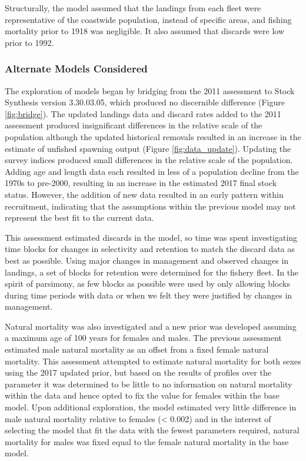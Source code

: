 \documentclass[12pt,]{article}
\begin{document}
Structurally, the model assumed that the landings from each fleet were
representative of the coastwide population, instead of specific areas,
and fishing mortality prior to 1918 was negligible. It also assumed that
discards were low prior to 1992.

\subsubsection{Alternate Models
Considered}\label{alternate-models-considered}

The exploration of models began by bridging from the 2011 assessment to
Stock Synthesis version 3.30.03.05, which produced no discernible
difference (Figure \ref{fig:bridge}). The updated landings data and
discard rates added to the 2011 assessment produced insignificant
differences in the relative scale of the population although the updated
historical removals resulted in an increase in the estimate of unfished
spawning output (Figure \ref{fig:data_update}). Updating the survey
indices produced small differences in the relative scale of the
population. Adding age and length data each resulted in less of a
population decline from the 1970s to pre-2000, resulting in an increase
in the estimated 2017 final stock status. However, the addition of new
data resulted in an early pattern within recruitment, indicating that
the assumptions within the previous model may not represent the best fit
to the current data.

This assessment estimated discards in the model, so time was spent
investigating time blocks for changes in selectivity and retention to
match the discard data as best as possible. Using major changes in
management and observed changes in landings, a set of blocks for
retention were determined for the fishery fleet. In the spirit of
parsimony, as few blocks as possible were used by only allowing blocks
during time periods with data or when we felt they were justified by
changes in management.

Natural mortality was also investigated and a new prior was developed
assuming a maximum age of 100 years for females and males. The previous
assessment estimated male natural mortality as an offset from a fixed
female natural mortality. This assessment attempted to estimate natural
mortality for both sexes using the 2017 updated prior, but based on the
results of profiles over the parameter it was determined to be little to
no information on natural mortality within the data and hence opted to
fix the value for females within the base model. Upon additional
exploration, the model estimated very little difference in male natural
mortality relative to females (\textless{} 0.002) and in the interest of
selecting the model that fit the data with the fewest parameters
required, natural mortality for males was fixed equal to the female
natural mortality in the base model.
\end{document}
